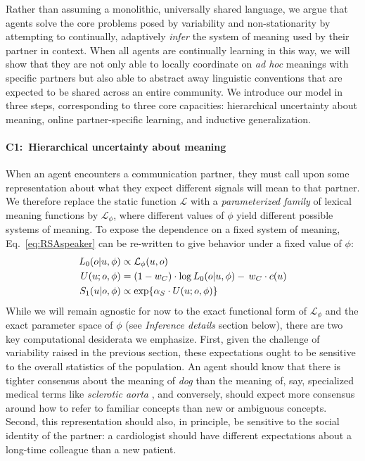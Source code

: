 Rather than assuming a monolithic, universally shared language, we argue that agents solve the core problems posed by variability and non-stationarity by attempting to continually, adaptively \emph{infer} the system of meaning used by their partner in context.
When all agents are continually learning in this way, we will show that they are not only able to locally coordinate on \emph{ad hoc} meanings with specific partners but also able to abstract away linguistic conventions that are expected to be shared across an entire community.
We introduce our model in three steps, corresponding to three core capacities: hierarchical uncertainty about meaning, online partner-specific learning, and inductive generalization.

\paragraph{C1:~Hierarchical uncertainty about meaning} 

When an agent encounters a communication partner, they must call upon some representation about what they expect different signals will mean to that partner. 
We therefore replace the static function $\mathcal{L}$ with a \emph{parameterized family} of lexical meaning functions by $\mathcal{L}_{\phi}$, where different values of $\phi$ yield different possible systems of meaning. 
To expose the dependence on a fixed system of meaning, Eq.~\ref{eq:RSAspeaker} can be re-written to give behavior under a fixed value of $\phi$:
\begin{align}
L_0(o | u, \phi) &\propto  \mathcal{L}_\phi(u,o)\hfill\label{eq:RSA} \\
U(u; o, \phi) & = (1-w_C) \cdot \log L_0(o | u, \phi) -\, w_C \cdot c(u) \nonumber  \\
S_1(u | o,\phi) & \propto   \exp\{\alpha_S \cdot U(u; o, \phi)\} \nonumber 
\end{align}
While we will remain agnostic for now to the exact functional form of $\mathcal{L}_\phi$ and the exact parameter space of $\phi$ (see \emph{Inference details} section below), there are two key computational desiderata we emphasize.
First, given the challenge of variability raised in the previous section, these expectations ought to be sensitive to the overall statistics of the population. 
An agent should know that there is tighter consensus about the meaning of \emph{dog} than the meaning of, say, specialized medical terms like \emph{sclerotic aorta} \cite{Clark98_CommunalLexicons}, and conversely, should expect more consensus around how to refer to familiar concepts than new or ambiguous concepts.
Second, this representation should also, in principle, be sensitive to the social identity of the partner: a cardiologist should have different expectations about a long-time colleague than a new patient.


